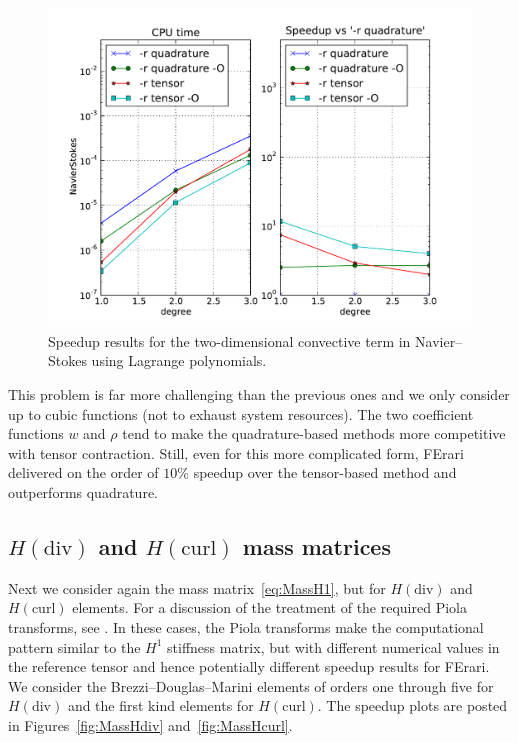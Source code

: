 \begin{figure}
  \begin{center}
    \includegraphics[width=12cm]{chapters/kirby-3/pdf/NavierStokes.pdf}
    \caption{Speedup results for the two-dimensional convective term
      in Navier--Stokes using Lagrange polynomials.}
    \label{fig:NavierStokes}
  \end{center}
\end{figure}

This problem is far more challenging than the previous ones and we
only consider up to cubic functions (not to exhaust system
resources). The two coefficient functions $ w $ and $ \rho $ tend to
make the quadrature-based methods more competitive with tensor
contraction.  Still, even for this more complicated form, FErari
delivered on the order of $ 10\% $ speedup over the tensor-based
method and outperforms quadrature.

\subsection{$H(\mathrm{div})$ and $H(\mathrm{curl})$ mass matrices}

Next we consider again the mass matrix~\eqref{eq:MassH1}, but for $
H(\mathrm{div})$ and $H(\mathrm{curl})$ elements. For a discussion of
the treatment of the required Piola transforms,
see \citet{RognesKirbyLogg2009}. In these cases, the Piola transforms
make the computational pattern similar to the $ H^1 $ stiffness
matrix, but with different numerical values in the reference tensor
and hence potentially different speedup results for FErari. We
consider the Brezzi--Douglas--Marini elements of orders one through
five for $ H(\mathrm{div}) $ and the first kind \nedelec{} elements
for $H(\mathrm{curl}) $. The speedup plots are posted in
Figures~\ref{fig:MassHdiv} and~\ref{fig:MassHcurl}.

